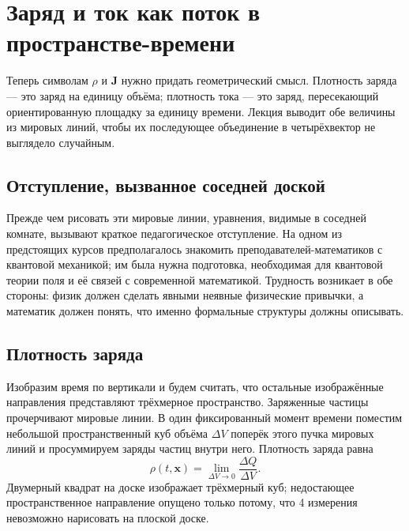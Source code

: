\section{Заряд и ток как поток в пространстве-времени}

Теперь символам \(\rho\) и \(\mathbf J\) нужно придать геометрический смысл. Плотность заряда — это заряд на единицу объёма; плотность тока — это заряд, пересекающий ориентированную площадку за единицу времени. Лекция выводит обе величины из мировых линий, чтобы их последующее объединение в четырёхвектор не выглядело случайным.

\subsection{Отступление, вызванное соседней доской}

Прежде чем рисовать эти мировые линии, уравнения, видимые в соседней комнате, вызывают краткое педагогическое отступление. На одном из предстоящих курсов предполагалось знакомить преподавателей-математиков с квантовой механикой; им была нужна подготовка, необходимая для квантовой теории поля и её связей с современной математикой. Трудность возникает в обе стороны: физик должен сделать явными неявные физические привычки, а математик должен понять, что именно формальные структуры должны описывать.

\begin{classroomqa}   \end{classroomqa}

\subsection{Плотность заряда}

Изобразим время по вертикали и будем считать, что остальные изображённые направления представляют трёхмерное пространство. Заряженные частицы прочерчивают мировые линии. В один фиксированный момент времени поместим небольшой пространственный куб объёма \(\Delta V\) поперёк этого пучка мировых линий и просуммируем заряды частиц внутри него. Плотность заряда равна \begin{equation}
\rho(t,\mathbf x)
=
\lim_{\Delta V\to0}
\frac{\Delta Q}{\Delta V}.
\label{eq:charge-density}
\end{equation} Двумерный квадрат на доске изображает трёхмерный куб; недостающее пространственное направление опущено только потому, что 4 измерения невозможно нарисовать на плоской доске.

